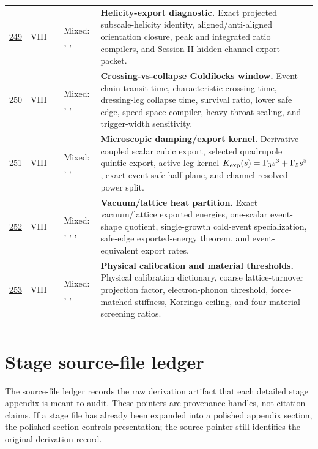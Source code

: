 {\begin{longtable}{@{}L{0.055\textwidth}L{0.075\textwidth}L{0.145\textwidth}L{0.235\textwidth}L{0.43\textwidth}@{}}
\addlinespace
\hyperref[stage:249]{249} & VIII &  & Mixed: \StatusExactClosure{}, \StatusEffective{}, \StatusNumerical{} & \textbf{Helicity-export diagnostic.} Exact projected subscale-helicity identity, aligned/anti-aligned orientation closure, peak and integrated ratio compilers, and Session-II hidden-channel export packet. \\
\addlinespace
\hyperref[stage:250]{250} & VIII &  & Mixed: \StatusExactClosure{}, \StatusEffective{}, \StatusNumerical{} & \textbf{Crossing-vs-collapse Goldilocks window.} Event-chain transit time, characteristic crossing time, dressing-leg collapse time, survival ratio, lower safe edge, speed-space compiler, heavy-throat scaling, and trigger-width sensitivity. \\
\addlinespace
\hyperref[stage:251]{251} & VIII &  & Mixed: \StatusExactClosure{}, \StatusReduced{}, \StatusOpen{} & \textbf{Microscopic damping/export kernel.} Derivative-coupled scalar cubic export, selected quadrupole quintic export, active-leg kernel \(K_{\rm exp}(s)=\Gamma_3s^3+\Gamma_5s^5\), exact event-safe half-plane, and channel-resolved power split. \\
\addlinespace
\hyperref[stage:252]{252} & VIII &  & Mixed: \StatusExactClosure{}, \StatusEffective{}, \StatusNumerical{}, \StatusOpen{} & \textbf{Vacuum/lattice heat partition.} Exact vacuum/lattice exported energies, one-scalar event-shape quotient, single-growth cold-event specialization, safe-edge exported-energy theorem, and event-equivalent export rates. \\
\addlinespace
\hyperref[stage:253]{253} & VIII &  & Mixed: \StatusExactClosure{}, \StatusEffective{}, \StatusOpen{} & \textbf{Physical calibration and material thresholds.} Physical calibration dictionary, coarse lattice-turnover projection factor, electron-phonon threshold, force-matched stiffness, Korringa ceiling, and four material-screening ratios. \\
\addlinespace
\bottomrule
\end{longtable}
}
\normalsize

\section{Stage source-file ledger}
\label{sec:stage-ledger-source-files}

The source-file ledger records the raw derivation artifact that each detailed stage appendix is meant to audit.  These pointers are provenance handles, not citation claims.  If a stage file has already been expanded into a polished appendix section, the polished section controls presentation; the source pointer still identifies the original derivation record.

